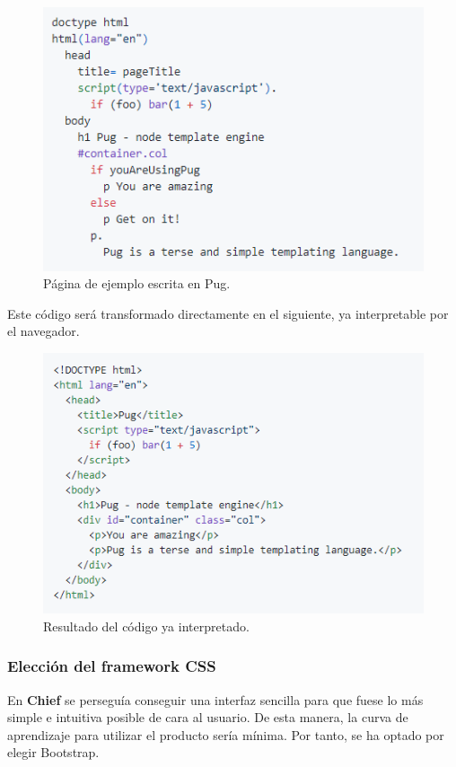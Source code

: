 \begin{figure}[H]
	\centering
	\includegraphics[scale=0.85]{imagenes/pug-example.png}
	\caption{Página de ejemplo escrita en Pug. \label{fig:figura8}}
\end{figure}

Este código será transformado directamente en el siguiente, ya interpretable por el navegador.

\begin{figure}[H]
	\centering
	\includegraphics[scale=0.85]{imagenes/pug-rendered.png}
	\caption{Resultado del código ya interpretado. \label{fig:figura9}}
\end{figure}


\subsubsection{Elección del framework CSS}

En \textbf{Chief} se perseguía conseguir una interfaz sencilla para que fuese lo más simple e intuitiva posible de cara al usuario. De esta manera, la curva de aprendizaje
para utilizar el producto sería mínima. Por tanto, se ha optado por elegir Bootstrap.\\

